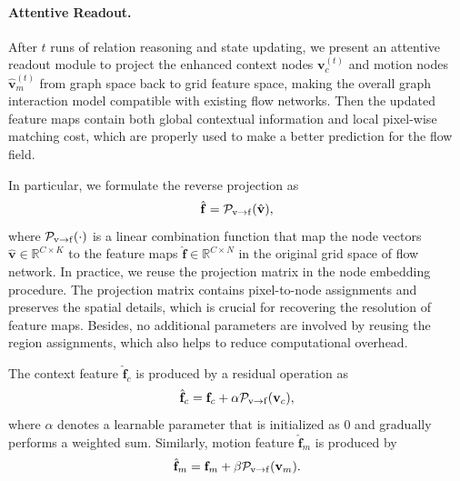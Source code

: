 \documentclass[letterpaper]{article} %
\begin{document}
\paragraph{Attentive Readout.}

After $t$ runs of relation reasoning and state updating, we present an attentive readout module to project the enhanced context nodes ${\mathbf v}_c^{(t)}$ and motion nodes $\hat{\mathbf v}_m^{(t)}$ from graph space back to grid feature space, making the overall graph interaction model compatible with existing flow networks. Then the updated feature maps contain both global contextual information and local pixel-wise matching cost, which are properly used to make a better prediction for the flow field.

In particular, we formulate the reverse projection as
\begin{equation}
	\hat{\mathbf f} = {\cal P}_{{\mathrm v}\rightarrow {\mathrm f}}(\hat{\mathbf v}),
\end{equation}
where ${\cal P}_{{\mathrm v}\rightarrow {\mathrm f}}(\cdot)$ is a linear combination function that map the node vectors $\hat{\mathbf v} \in \mathbb{R}^{C \times K}$ to the feature maps $\hat{\mathbf f} \in \mathbb{R}^{C \times N}$ in the original grid space of flow network. In practice, we reuse the projection matrix in the node embedding procedure. The projection matrix contains pixel-to-node assignments and preserves the spatial details, which is crucial for recovering the resolution of feature maps. Besides, no additional parameters are involved by reusing the region assignments, which also helps to reduce computational overhead. 

The context feature $\hat{\mathbf f}_c$ is produced by a residual operation as
\begin{equation}
	\hat{\mathbf f}_c = {\mathbf f}_c + \alpha {\cal P}_{{\mathrm v}\rightarrow {\mathrm f}}({\mathbf v}_c),
\end{equation}
where $\alpha$ denotes a learnable parameter that is initialized as $0$ and gradually performs a weighted sum. Similarly, motion feature $\hat{\mathbf f}_m$ is produced by
\begin{equation}
	\hat{\mathbf f}_m = {\mathbf f}_m + \beta {\cal P}_{{\mathrm v}\rightarrow {\mathrm f}}({\mathbf v}_m).
\end{equation}
\end{document}
